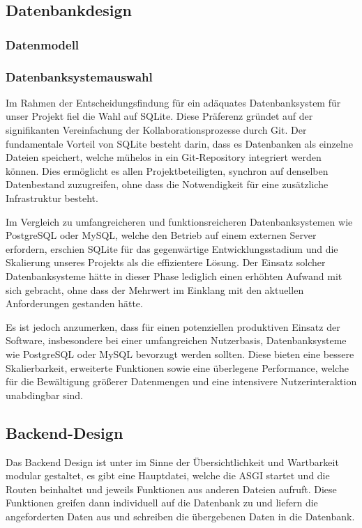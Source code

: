 \documentclass[../main.tex]{subfiles} %
\begin{document}
\subsection{Datenbankdesign} %



\subsubsection{Datenmodell}

\subsubsection{Datenbanksystemauswahl}
Im Rahmen der Entscheidungsfindung für ein adäquates Datenbanksystem für unser Projekt fiel die Wahl auf SQLite.
Diese Präferenz gründet auf der signifikanten Vereinfachung der Kollaborationsprozesse durch Git. Der fundamentale Vorteil von SQLite besteht darin, dass es Datenbanken als einzelne Dateien speichert, welche mühelos in ein Git-Repository integriert werden können.
Dies ermöglicht es allen Projektbeteiligten, synchron auf denselben Datenbestand zuzugreifen, ohne dass die Notwendigkeit für eine zusätzliche Infrastruktur besteht.

Im Vergleich zu umfangreicheren und funktionsreicheren Datenbanksystemen wie PostgreSQL oder MySQL, welche den Betrieb auf einem externen Server erfordern, erschien SQLite für das gegenwärtige Entwicklungsstadium und die Skalierung unseres Projekts als die effizientere Lösung. Der Einsatz solcher Datenbanksysteme hätte in dieser Phase lediglich einen erhöhten Aufwand mit sich gebracht, ohne dass der Mehrwert im Einklang mit den aktuellen Anforderungen gestanden hätte.

Es ist jedoch anzumerken, dass für einen potenziellen produktiven Einsatz der Software, insbesondere bei einer umfangreichen Nutzerbasis, Datenbanksysteme wie PostgreSQL oder MySQL bevorzugt werden sollten.
Diese bieten eine bessere Skalierbarkeit, erweiterte Funktionen sowie eine überlegene Performance, welche für die Bewältigung größerer Datenmengen und eine intensivere Nutzerinteraktion unabdingbar sind.

\subsection{Backend-Design} %

Das Backend Design ist unter im Sinne der Übersichtlichkeit und Wartbarkeit modular gestaltet, es gibt eine Hauptdatei,
welche die ASGI startet und die Routen beinhaltet und jeweils Funktionen aus anderen Dateien aufruft. Diese Funktionen greifen
dann individuell auf die Datenbank zu und liefern die angeforderten Daten aus und schreiben die übergebenen Daten in die Datenbank.
\end{document}
